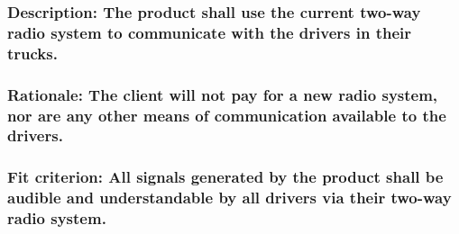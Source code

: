 \documentclass[
]{article}
\begin{document}
\hypertarget{section-2}{%
\subsubsection{}\label{section-2}}

\hypertarget{description-the-product-shall-use-the-current-two-way-radio-system-to-communicate-with-the-drivers-in-their-trucks.}{%
\subsubsection{Description: The product shall use the current two-way
radio system to communicate with the drivers in their
trucks.}\label{description-the-product-shall-use-the-current-two-way-radio-system-to-communicate-with-the-drivers-in-their-trucks.}}

\hypertarget{rationale-the-client-will-not-pay-for-a-new-radio-system-nor-are-any-other-means-of-communication-available-to-the-drivers.}{%
\subsubsection{\texorpdfstring{Rationale: The client will not pay for a
new radio system, nor are any other means of communication available to
the drivers.
}{Rationale: The client will not pay for a new radio system, nor are any other means of communication available to the drivers. }}\label{rationale-the-client-will-not-pay-for-a-new-radio-system-nor-are-any-other-means-of-communication-available-to-the-drivers.}}

\hypertarget{fit-criterion-all-signals-generated-by-the-product-shall-be-audible-and-understandable-by-all-drivers-via-their-two-way-radio-system.}{%
\subsubsection{\texorpdfstring{Fit criterion: All signals generated by
the product shall be audible and understandable by all drivers via their
two-way radio system.
}{Fit criterion: All signals generated by the product shall be audible and understandable by all drivers via their two-way radio system. }}\label{fit-criterion-all-signals-generated-by-the-product-shall-be-audible-and-understandable-by-all-drivers-via-their-two-way-radio-system.}}

\hypertarget{section-3}{%
\subsubsection{}\label{section-3}}
\end{document}
